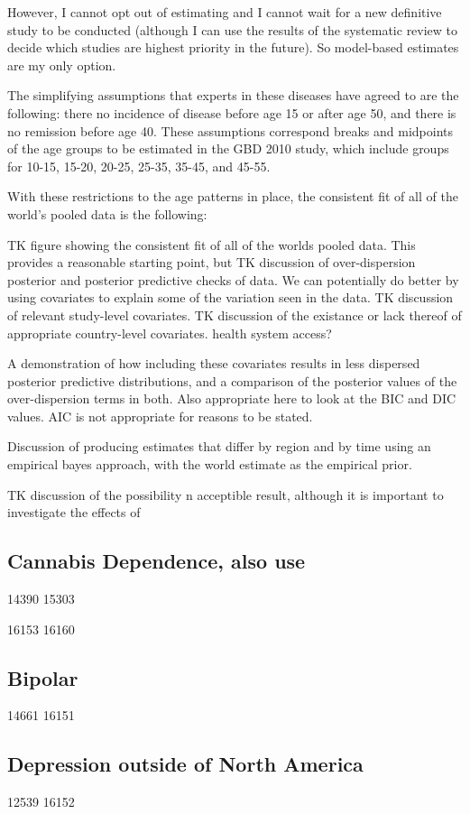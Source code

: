 However, I cannot opt out of estimating and I cannot wait for a new
definitive study to be conducted (although I can use the results of
the systematic review to decide which studies are highest priority in
the future).  So model-based estimates are my only option.

The simplifying assumptions that experts in these diseases have agreed
to are the following: there no incidence of disease before age 15 or
after age 50, and there is no remission before age 40.  These
assumptions correspond breaks and midpoints of the age groups to be
estimated in the GBD 2010 study, which include groups for 10-15,
15-20, 20-25, 25-35, 35-45, and 45-55.

With these restrictions to the age patterns in place, the consistent
fit of all of the world's pooled data is the following:

TK figure showing the consistent fit of all of the worlds pooled
data.  This provides a reasonable starting point, but TK discussion of
over-dispersion posterior and posterior predictive checks of data.  We
can potentially do better by using covariates to explain some of the
variation seen in the data.  TK discussion of relevant study-level
covariates.  TK discussion of the existance or lack thereof of
appropriate country-level covariates.  health system access?  

A demonstration of how including these covariates results in less
dispersed posterior predictive distributions, and a comparison of the
posterior values of the over-dispersion terms in both.  Also
appropriate here to look at the BIC and DIC values.  AIC is not
appropriate for reasons to be stated.

Discussion of producing estimates that differ by region and  by time
using an empirical bayes approach, with the world estimate as the
empirical prior.

TK discussion of the possibility n acceptible result, although it is important to
investigate the effects of 

\subsection{Cannabis Dependence, also use}
14390 15303 

16153 16160 

\subsection{Bipolar}
14661 
16151 

\subsection{Depression outside of North America}
12539 
16152
